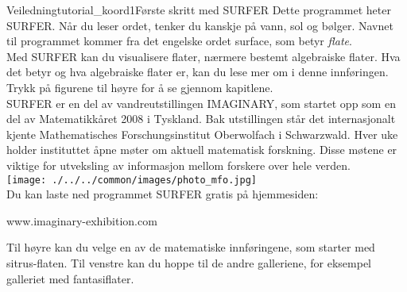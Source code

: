 \begin{surferIntroPage}{Veiledning}{tutorial_koord1}{Første skritt med SURFER}
 Dette programmet heter SURFER. Når du leser ordet, tenker du kanskje på vann, sol og bølger. 
 Navnet til programmet kommer fra det engelske ordet surface, som betyr {\it flate}. 
\\
Med SURFER kan du visualisere flater, nærmere bestemt algebraiske flater. Hva det betyr og 
hva algebraiske flater er, kan du lese mer om i denne innføringen. Trykk på figurene til 
høyre for å se gjennom kapitlene.\\

SURFER er en del av vandreutstillingen IMAGINARY, som startet opp som en del av Matematikkåret
 2008 i Tyskland. Bak utstillingen står det internasjonalt kjente Mathematisches Forschungsinstitut 
 Oberwolfach i Schwarzwald. Hver uke holder instituttet åpne møter om aktuell matematisk forskning.
 Disse møtene er viktige for utveksling av informasjon mellom forskere over hele verden.\\
 
\vspace{0.2cm} \hspace{3.5cm}\texttt{[image: ./../../common/images/photo\_mfo.jpg]}\\
Du kan laste ned programmet SURFER gratis på hjemmesiden: \\
\begin{centering}
www.imaginary-exhibition.com\\
\end{centering}
 \vspace{0.2cm}
Til høyre kan du velge en av de matematiske innføringene, som starter med sitrus-flaten.
 Til venstre kan du hoppe til de andre galleriene, for eksempel galleriet med fantasiflater.
\end{surferIntroPage}
